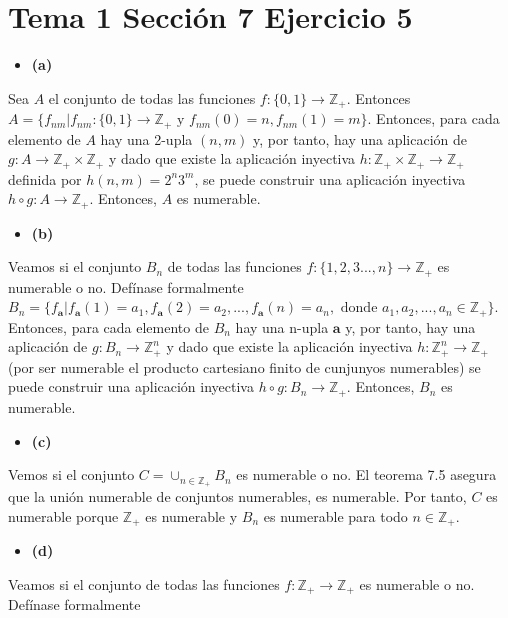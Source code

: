 \documentclass{article}
\newcommand{\vect}[1]{\boldsymbol{#1}}
\begin{document}
\section{Tema 1 Sección 7 Ejercicio 5}
\begin{itemize}
\item \bf (a) \rm
\end{itemize}
Sea $A$ el conjunto de todas las funciones $f:\{0,1\}\rightarrow \mathbb{Z}_{+}$. Entonces $A=\{f_{nm}|f_{nm}:\{0,1\}\rightarrow \mathbb{Z}_{+} \text{ y } f_{nm}(0)=n,f_{nm}(1)=m \}$. Entonces,  para cada elemento de $A$ hay una 2-upla $(n,m)$ y, por tanto, hay una aplicación de $g:A\rightarrow \mathbb{Z}_{+}\times \mathbb{Z}_{+}$ y dado que existe la aplicación inyectiva $h:\mathbb{Z}_{+}\times \mathbb{Z}_{+}\rightarrow  \mathbb{Z}_{+}$ definida por $h(n,m)=2^n3^m$, se puede construir una aplicación inyectiva $h\circ g :A\rightarrow \mathbb{Z}_{+}$. Entonces, $A$ es numerable. 
\begin{itemize}
\item \bf (b) \rm
\end{itemize}
Veamos si el conjunto $B_n$ de todas las funciones $f:\{1,2,3...,n\}\rightarrow \mathbb{Z}_{+}$ es numerable o no. Defínase formalmente $B_n=\{f_{\vect{a}}| f_{\vect{a}}(1)=a_1,f_{\vect{a}}(2)=a_2,...,f_{\vect{a}}(n)=a_n,\text{ donde } a_1,a_2,...,a_n\in \mathbb{Z}_{+}\}$. Entonces,  para cada elemento de $B_n$ hay una n-upla $\vect{a}$ y, por tanto, hay una aplicación de $g:B_n\rightarrow \mathbb{Z}^{n}_{+}$ y dado que existe la aplicación inyectiva $h:\mathbb{Z}^{n}_{+}\rightarrow  \mathbb{Z}_{+}$ (por ser numerable el producto cartesiano finito de cunjunyos numerables) se puede construir una aplicación inyectiva $h\circ g :B_n\rightarrow \mathbb{Z}_{+}$. Entonces, $B_n$ es numerable.
\begin{itemize}
\item \bf (c) \rm
\end{itemize}
Vemos si el conjunto $C=\cup_{n\in\mathbb{Z}_{+}}B_n$ es numerable o no. El teorema 7.5 asegura que la unión numerable de conjuntos numerables, es numerable. Por tanto, $C$ es numerable porque $\mathbb{Z}_{+}$ es numerable y $B_n$ es numerable para todo $n\in \mathbb{Z}_{+}$.
\begin{itemize}
\item \bf (d) \rm
\end{itemize}
Veamos si el conjunto de todas las funciones $f:\mathbb{Z}_{+}\rightarrow \mathbb{Z}_{+}$ es numerable o no. Defínase formalmente
\newline
\end{document}
